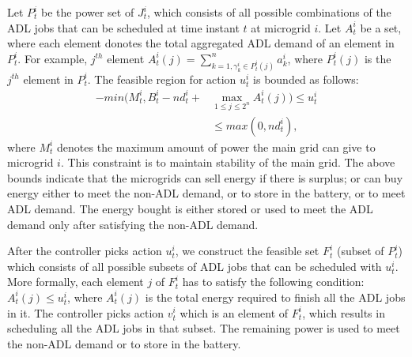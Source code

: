 Let $P_{t}^{i}$ be the power set of $J_{t}^{i}$, which consists of all possible combinations of the ADL jobs that can be scheduled at time instant $t$ at microgrid $i$. Let  $A_{t}^{i}$ be a set, where each element donotes the total aggregated ADL demand of an element in $P_{t}^{i}$. For example, $j^{th}$ element $A_{t}^{i}(j) = \sum_{k=1, \gamma_k^i \in P_{t}^{i}(j) }^n a_k^i$, where $ P_{t}^{i}(j)$ is the $j^{th}$ element in  $P_{t}^{i}$.
 The feasible region for action $u_{t}^{i}$ is bounded as follows:
\begin{align}
-min(M_t^i, B_t^i - nd_t^i + &\max_{1\leq j \leq 2^n} A_t^i(j) ) \leq u_t^i \nonumber\\ &\leq max(0, nd_t^i),
\end{align}
where $M_t^i$ denotes the maximum amount of power the main grid can give to microgrid $i$. This constraint is to maintain stability of the main grid. The above bounds indicate that the  microgrids can sell energy if there is surplus; or can buy energy either to meet the non-ADL demand, or to store in the battery, or to meet ADL demand. The energy bought is either stored or used to meet the ADL demand only after satisfying the non-ADL demand. 

After the controller picks action $u_{t}^{i}$, we construct the feasible set $F_{t}^{i}$ (subset of $P_{t}^{i}$) which  consists of all possible subsets of ADL jobs that can be scheduled with $u_{t}^{i}$. More formally, each element $j$ of  $F_{t}^{i}$ has to satisfy the following condition:   $A_t^i(j) \leq u_{t}^{i} $, where $A_t^i(j)$ is the total energy required to finish all the ADL jobs in it. The controller picks action $v_{t}^{i}$ which is an element of $F_{t}^{i}$, which results in scheduling all the ADL jobs in that subset. The remaining power is used to meet the non-ADL demand or to store in the battery.


